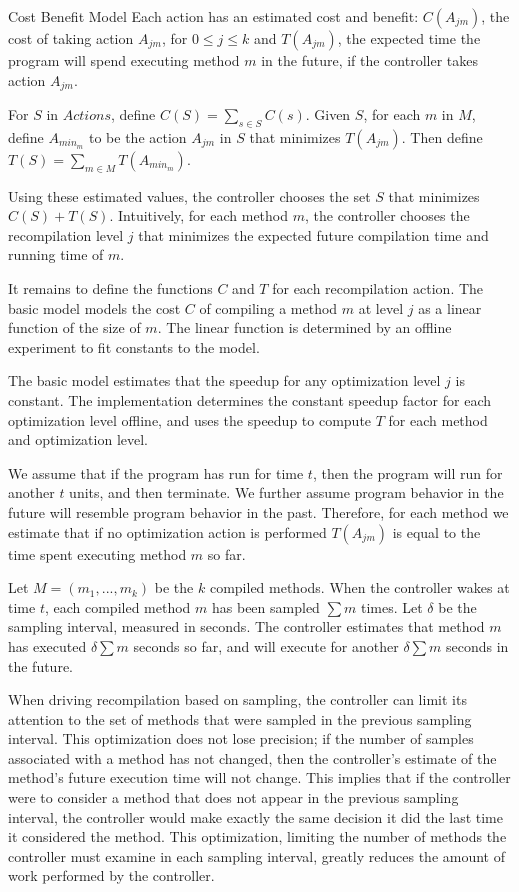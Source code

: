 \begin{section}{Cost Benefit Model}
Each action has an estimated cost and benefit: $C(A_{jm})$, the cost of taking action $A_{jm}$, for $0 \leq j \leq k$ and $T(A_{jm})$, the expected time the program will spend executing method $m$ in the future, if the controller takes action $A_{jm}$.

For $S$ in $Actions$, define $C(S) = \sum_{s \in S} C(s)$. Given $S$, for each $m$ in $M$, define $A_{min_m}$ to be the action $A_{jm}$ in $S$ that minimizes $T(A_{jm})$.  Then define $T(S) = \sum_{m \in M} T(A_{min_m})$.

Using these estimated values, the controller chooses the set $S$ that minimizes $C(S) + T(S)$. Intuitively, for each method $m$, the controller chooses the recompilation level $j$ that minimizes the expected future compilation time and running time of $m$.

It remains to define the functions $C$ and $T$ for each recompilation action. The basic model models the cost $C$ of compiling a method $m$ at level $j$ as a linear function of the size of $m$. The linear function is determined by an offline experiment to fit constants to the model.

The basic model estimates that the speedup for any optimization level $j$ is constant. The implementation determines the constant speedup factor for each optimization level offline, and uses the speedup to compute $T$ for each method and optimization level.

We assume that if the program has run for time $t$, then the program will run for another $t$ units, and then terminate. We further assume program behavior in the future will resemble program behavior in the past. Therefore, for each method we estimate that if no optimization action is performed $T(A_{jm})$ is equal to the time spent executing method $m$ so far.

Let $M=(m_1, ..., m_k)$ be the $k$ compiled methods. When the controller wakes at time $t$, each compiled method $m$ has been sampled $\sum m$ times. Let $\delta$ be the sampling interval, measured in seconds. The controller estimates that method $m$ has executed $\delta \sum m$ seconds so far, and will execute for another $\delta \sum m$ seconds in the future.

When driving recompilation based on sampling, the controller can limit its attention to the set of methods that were sampled in the previous sampling interval. This optimization does not lose precision; if the number of samples associated with a method has not changed, then the controller's estimate of the method's future execution time will not change. This implies that if the controller were to consider a
method that does not appear in the previous sampling interval, the controller would make exactly the same decision it did the last time it considered the method. This optimization, limiting the number of methods the controller must examine in each sampling interval, greatly reduces the amount of work performed by the controller.


\end{section}
